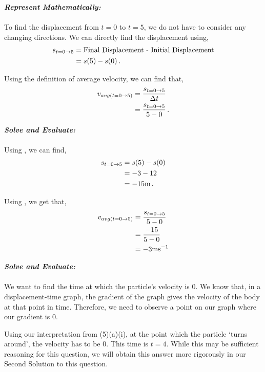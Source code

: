 \begin{subquestions}
\begin{subsubquestions}
\begin{subsubsubquestions}
\textbf{\textit{Represent Mathematically:}} \\ \\
To find the displacement from $t=0$ to $t=5$, we do not have to consider any changing directions. We can directly find the displacement using,
\begin{align}
	s_{t=0 \rightarrow 5} & = \text{Final Displacement - Initial Displacement} \nonumber \\
	                      & =  s(5)-s(0) \,. \label{2014:q5:Seqn4} 
\end{align}

Using the definition of average velocity, we can find that,
\begin{align}
	v_{avg(t=0 \rightarrow 5)} & = \frac{s_{t=0 \rightarrow 5}}{\Delta t} \nonumber \\
	                           & = \frac{s_{t=0 \rightarrow 5}}{5-0} \,. \label{2014:q5:Seqn5}
\end{align}

\textbf{\textit{Solve and Evaluate:}} \\ \\
Using , we can find,
\begin{align}
	s_{t=0 \rightarrow 5} & =  s(5)-s(0) \nonumber \\
	                      & = -3 - 12 \nonumber \\
	                      & = -15 \text{m} \,.
\end{align}

Using , we get that,
\begin{align}
	v_{avg(t=0 \rightarrow 5)} & =\frac{s_{t=0 \rightarrow 5}}{5-0} \nonumber \\
								 & = \frac{-15}{5-0} \nonumber \\
								 & = -3 \text{ms}^{-1} 
\end{align}


\subsubsubquestion

\textbf{\textit{Solve and Evaluate:}} \\ \\
We want to find the time at which the particle's velocity is 0. We know that, in a displacement-time graph, the gradient of the graph gives the velocity of the body at that point in time. Therefore, we need to observe a point on our graph where our gradient is 0. 

Using our interpretation from (5)(a)(i), at the point which the particle `turns around', the velocity has to be 0. This time is $t=4$. While this may be sufficient reasoning for this question, we will obtain this answer more rigorously in our Second Solution to this question. 


\end{subsubsubquestions}
\end{subsubquestions}
\end{subquestions}
